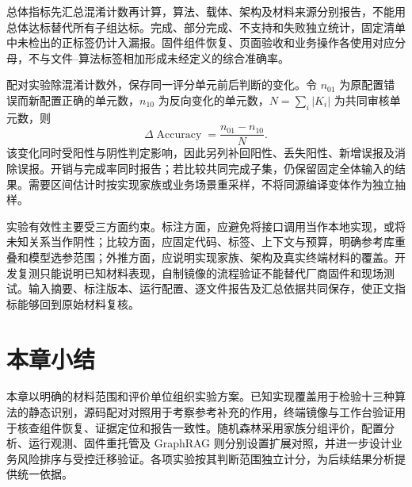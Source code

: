 总体指标先汇总混淆计数再计算，算法、载体、架构及材料来源分别报告，不能用总体达标替代所有子组达标。完成、部分完成、不支持和失败独立统计，固定清单中未检出的正标签仍计入漏报。固件组件恢复、页面验收和业务操作各使用对应分母，不与文件--算法标签相加形成未经定义的综合准确率。

配对实验除混淆计数外，保存同一评分单元前后判断的变化。令 $n_{01}$ 为原配置错误而新配置正确的单元数，$n_{10}$ 为反向变化的单元数，$N=\sum_i|K_i|$ 为共同审核单元数，则
\begin{equation}
  \Delta\operatorname{Accuracy}=\frac{n_{01}-n_{10}}{N}.
  \label{eq:paired-accuracy-difference}
\end{equation}
该变化同时受阳性与阴性判定影响，因此另列补回阳性、丢失阳性、新增误报及消除误报。开销与完成率同时报告；若比较共同完成子集，仍保留固定全体输入的结果。需要区间估计时按实现家族或业务场景重采样，不将同源编译变体作为独立抽样。

实验有效性主要受三方面约束。标注方面，应避免将接口调用当作本地实现，或将未知关系当作阴性；比较方面，应固定代码、标签、上下文与预算，明确参考库重叠和模型选参范围；外推方面，应说明实现家族、架构及真实终端材料的覆盖。开发复测只能说明已知材料表现，自制镜像的流程验证不能替代厂商固件和现场测试。输入摘要、标注版本、运行配置、逐文件报告及汇总依据共同保存，使正文指标能够回到原始材料复核。

\section{本章小结}

本章以明确的材料范围和评价单位组织实验方案。已知实现覆盖用于检验十三种算法的静态识别，源码配对对照用于考察参考补充的作用，终端镜像与工作台验证用于核查组件恢复、证据定位和报告一致性。随机森林采用家族分组评价，配置分析、运行观测、固件重托管及 GraphRAG 则分别设置扩展对照，并进一步设计业务风险排序与受控迁移验证。各项实验按其判断范围独立计分，为后续结果分析提供统一依据。
